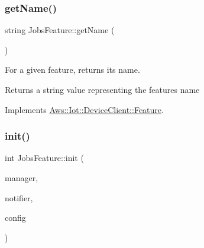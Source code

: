 \subsubsection{\texorpdfstring{get\+Name()}{getName()}}
{\footnotesize\ttfamily string Jobs\+Feature\+::get\+Name (\begin{DoxyParamCaption}{ }\end{DoxyParamCaption})\hspace{0.3cm}{\ttfamily [virtual]}}



For a given feature, returns its name. 

\begin{DoxyReturn}{Returns}
a string value representing the feature\textquotesingle{}s name 
\end{DoxyReturn}


Implements \hyperlink{class_aws_1_1_iot_1_1_device_client_1_1_feature_a7f56b81457898d67ddc1942e57e3c0d5}{Aws\+::\+Iot\+::\+Device\+Client\+::\+Feature}.

\mbox{\label{class_aws_1_1_iot_1_1_device_client_1_1_jobs_1_1_jobs_feature_ae5ed8ac46280309eb3918b1d19ec1c54}} 
\subsubsection{\texorpdfstring{init()}{init()}}
{\footnotesize\ttfamily int Jobs\+Feature\+::init (\begin{DoxyParamCaption}\item[{std\+::shared\+\_\+ptr$<$ \hyperlink{class_aws_1_1_iot_1_1_device_client_1_1_shared_crt_resource_manager}{Shared\+Crt\+Resource\+Manager} $>$}]{manager,  }\item[{std\+::shared\+\_\+ptr$<$ \hyperlink{class_aws_1_1_iot_1_1_device_client_1_1_client_base_notifier}{Client\+Base\+Notifier} $>$}]{notifier,  }\item[{const \hyperlink{struct_aws_1_1_iot_1_1_device_client_1_1_plain_config}{Plain\+Config} \&}]{config }\end{DoxyParamCaption})\hspace{0.3cm}{\ttfamily [virtual]}}



